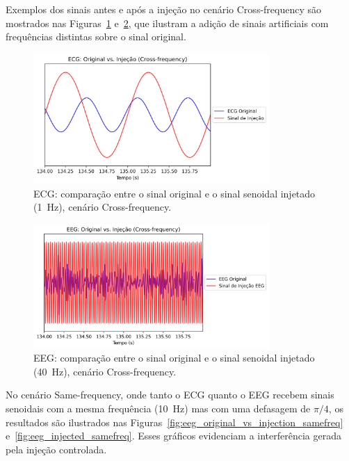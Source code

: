 Exemplos dos sinais antes e após a injeção no cenário Cross-frequency são mostrados nas Figuras~\ref{fig:ecg_injection} e~\ref{fig:eeg_injection}, que ilustram a adição de sinais artificiais com frequências distintas sobre o sinal original.

\begin{figure}[htb]
    \centering
    \includegraphics[width=0.8\textwidth]{figs/3_2_testing_connectivity_metrics/1_ECG_Original_vs_Injecao_Cross-frequency.png}
    \caption{ECG: comparação entre o sinal original e o sinal senoidal injetado (1~Hz), cenário Cross-frequency.}
    \label{fig:ecg_injection}
\end{figure}

\begin{figure}[htb]
    \centering
    \includegraphics[width=0.8\textwidth]{figs/3_2_testing_connectivity_metrics/3_EEG_Original_vs_Injecao_Cross-frequency.png}
    \caption{EEG: comparação entre o sinal original e o sinal senoidal injetado (40~Hz), cenário Cross-frequency.}
    \label{fig:eeg_injection}
\end{figure}

No cenário Same-frequency, onde tanto o ECG quanto o EEG recebem sinais senoidais com a mesma frequência (10~Hz) mas com uma defasagem de \(\pi/4\), os resultados são ilustrados nas Figuras~\ref{fig:eeg_original_vs_injection_samefreq} e~\ref{fig:eeg_injected_samefreq}. Esses gráficos evidenciam a interferência gerada pela injeção controlada.

